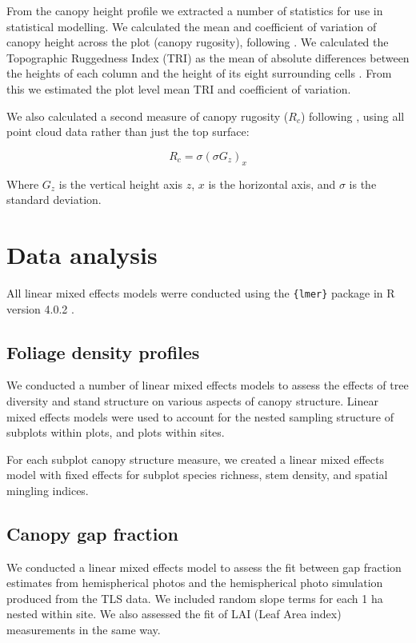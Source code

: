 \documentclass[11pt,a4paper]{article}
\begin{document}
From the canopy height profile we extracted a number of statistics for use in statistical modelling. We calculated the mean and coefficient of variation of canopy height across the plot (canopy rugosity), following \citep{Parker2004}. We calculated the Topographic Ruggedness Index (TRI) as the mean of absolute differences between the heights of each column and the height of its eight surrounding cells \citep{Wilson2007}. From this we estimated the plot level mean TRI and coefficient of variation. 

We also calculated a second measure of canopy rugosity ($R_{c}$) following \citet{Hardiman2011}, using all point cloud data rather than just the top surface:

\begin{equation}
	R_{c} = \sigma{}(\sigma{}G_{z})_{x}
\end{equation}

Where $G_{z}$ is the vertical height axis $z$, $x$ is the horizontal axis, and $\sigma{}$ is the standard deviation.

\section{Data analysis}

All linear mixed effects models werre conducted using the \texttt{\{lmer\}} package in R version 4.0.2 \citep{R2021}.

\subsection{Foliage density profiles}

We conducted a number of linear mixed effects models to assess the effects of tree diversity and stand structure on various aspects of canopy structure. Linear mixed effects models were used to account for the nested sampling structure of subplots within plots, and plots within sites.

For each subplot canopy structure measure, we created a linear mixed effects model with fixed effects for subplot species richness, stem density, and spatial mingling indices.

\subsection{Canopy gap fraction}

We conducted a linear mixed effects model to assess the fit between gap fraction estimates from hemispherical photos and the hemispherical photo simulation produced from the TLS data. We included random slope terms for each 1 ha nested within site. We also assessed the fit of LAI (Leaf Area index) measurements in the same way.
\end{document}
